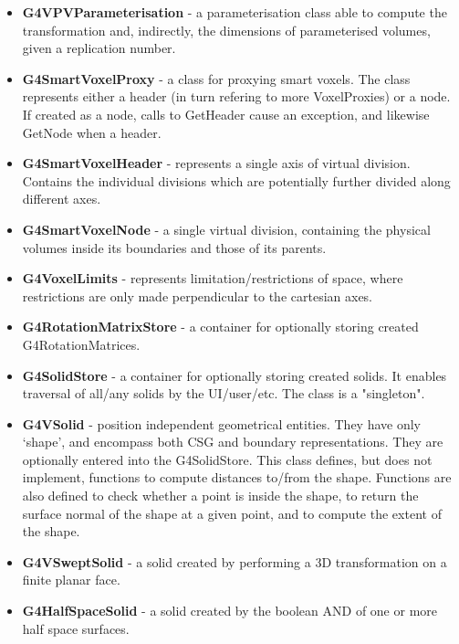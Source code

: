 \begin{itemize}
\item {\bf G4VPVParameterisation} -
   a parameterisation class able to compute the transformation and, 
   indirectly, the dimensions of parameterised volumes, given a replication 
   number. 

\item {\bf G4SmartVoxelProxy} -
   a class for proxying smart voxels.  The class represents either a header 
   (in turn refering to more VoxelProxies) or a node.  If created as a node, 
   calls to GetHeader cause an exception, and likewise GetNode when a header. 

\item {\bf G4SmartVoxelHeader} -
   represents a single axis of virtual division.  Contains the individual 
   divisions which are potentially further divided along different axes.
 
\item {\bf G4SmartVoxelNode} -
   a single virtual division, containing the physical volumes inside its 
   boundaries and those of its parents.
 
\item {\bf G4VoxelLimits} -
   represents limitation/restrictions of space, where restrictions are only 
   made perpendicular to the cartesian axes. 

\item {\bf G4RotationMatrixStore} -
   a container for optionally storing created G4RotationMatrices.
 
\item {\bf G4SolidStore} -
   a container for optionally storing created solids.  It enables traversal 
   of all/any solids by the UI/user/etc. The class is a "singleton".
 
\item {\bf G4VSolid} -
   position independent geometrical entities. They have only `shape', and 
   encompass both CSG and boundary representations.  They are optionally 
   entered into the G4SolidStore.  This class defines, but does not implement, 
   functions to compute distances to/from the shape.  Functions are also 
   defined to check whether a point is inside the shape, to return the 
   surface normal of the shape at a given point, and to compute the extent 
   of the shape. 

\item {\bf G4VSweptSolid} -
   a solid created by performing a 3D transformation on a finite planar face.
 
\item {\bf G4HalfSpaceSolid} -
   a solid created by the boolean AND of one or more half space surfaces.
 

\end{itemize}
